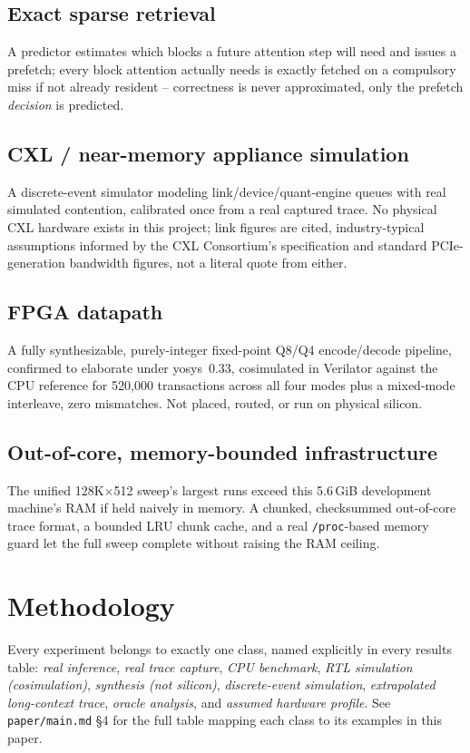 \documentclass[11pt]{article}
\begin{document}
\subsection{Exact sparse retrieval} A predictor estimates which blocks a
future attention step will need and issues a prefetch; every block
attention actually needs is exactly fetched on a compulsory miss if not
already resident -- correctness is never approximated, only the
prefetch \emph{decision} is predicted.

\subsection{CXL / near-memory appliance simulation} A discrete-event
simulator modeling link/device/quant-engine queues with real simulated
contention, calibrated once from a real captured trace. No physical CXL
hardware exists in this project; link figures are cited, industry-typical
assumptions informed by the CXL Consortium's specification
\cite{cxlconsortium2023spec} and standard PCIe-generation bandwidth
figures, not a literal quote from either.

\subsection{FPGA datapath} A fully synthesizable, purely-integer
fixed-point Q8/Q4 encode/decode pipeline, confirmed to elaborate under
yosys~0.33, cosimulated in Verilator against the CPU reference for
520{,}000 transactions across all four modes plus a mixed-mode
interleave, zero mismatches. Not placed, routed, or run on physical
silicon.

\subsection{Out-of-core, memory-bounded infrastructure} The unified
128K$\times$512 sweep's largest runs exceed this 5.6\,GiB development
machine's RAM if held naively in memory. A chunked, checksummed
out-of-core trace format, a bounded LRU chunk cache, and a real
\texttt{/proc}-based memory guard let the full sweep complete without
raising the RAM ceiling.

\section{Methodology}

Every experiment belongs to exactly one class, named explicitly in every
results table: \emph{real inference}, \emph{real trace capture},
\emph{CPU benchmark}, \emph{RTL simulation (cosimulation)},
\emph{synthesis (not silicon)}, \emph{discrete-event simulation},
\emph{extrapolated long-context trace}, \emph{oracle analysis}, and
\emph{assumed hardware profile}. See \texttt{paper/main.md} \S4 for the
full table mapping each class to its examples in this paper.
\end{document}
